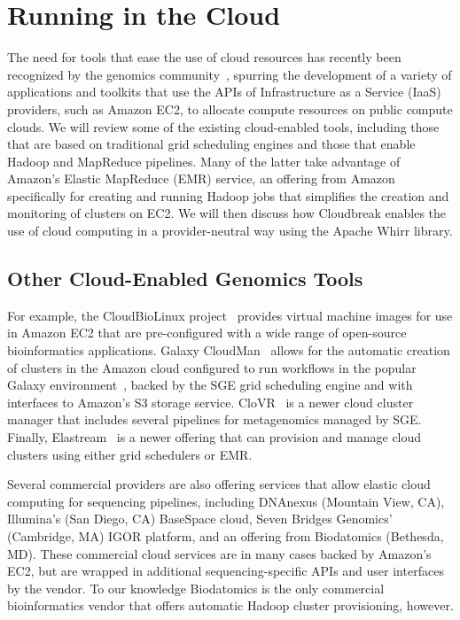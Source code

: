 \section{Running in the Cloud}\label{section_cloud_whirr}

The need for tools that ease the use of cloud resources has recently been recognized by the genomics community~\cite{Schatz:2010js,Stein:2010gp}, spurring the development of a variety of applications and toolkits that use the APIs of Infrastructure as a Service (IaaS) providers, such as Amazon EC2, to allocate compute resources on public compute clouds. We will review some of the existing cloud-enabled tools, including those that are based on traditional grid scheduling engines and those that enable Hadoop and MapReduce pipelines. Many of the latter take advantage of Amazon's Elastic MapReduce (EMR) service, an offering from Amazon specifically for creating and running Hadoop jobs that simplifies the creation and monitoring of clusters on EC2. We will then discuss how Cloudbreak enables the use of cloud computing in a provider-neutral way using the Apache Whirr library.

\subsection{Other Cloud-Enabled Genomics Tools}

For example, the CloudBioLinux project~\cite{Krampis:2012wo} provides virtual machine images for use in Amazon EC2 that are pre-configured with a wide range of open-source bioinformatics applications. Galaxy CloudMan~\cite{Afgan:2010fa} allows for the automatic creation of clusters in the Amazon cloud configured to run workflows in the popular Galaxy environment~\cite{Giardine:2005ig}, backed by the SGE grid scheduling engine and with interfaces to Amazon's S3 storage service. CloVR~\cite{Angiuoli:2011wl} is a newer cloud cluster manager that includes several pipelines for metagenomics managed by SGE. Finally, Elastream~\cite{Issa:2013jp} is a newer offering that can provision and manage cloud clusters using either grid schedulers or EMR. 

Several commercial providers are also offering services that allow elastic cloud computing for sequencing pipelines, including DNAnexus (Mountain View, CA), Illumina's (San Diego, CA) BaseSpace cloud, Seven Bridges Genomics' (Cambridge, MA) IGOR platform, and an offering from Biodatomics (Bethesda, MD). These commercial cloud services are in many cases backed by Amazon's EC2, but are wrapped in additional sequencing-specific APIs and user interfaces by the vendor. To our knowledge Biodatomics is the only commercial bioinformatics vendor that offers automatic Hadoop cluster provisioning, however. 

